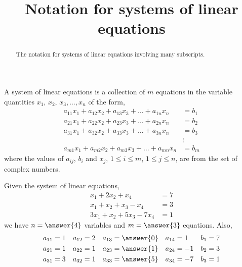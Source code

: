 \documentclass{ximera}
\title{Notation for systems of linear equations}
\begin{document}
\begin{abstract}
  The notation for systems of linear equations involving many subscripts.
\end{abstract}
\maketitle

\begin{definition}
A system of linear equations is a collection of $m$ equations in the variable quantities $x_1,\,x_2,\,x_3,\ldots,x_n$ of the form,
\begin{align*}
a_{11}x_1+a_{12}x_2+a_{13}x_3+\dots+a_{1n}x_n&=b_1\\
a_{21}x_1+a_{22}x_2+a_{23}x_3+\dots+a_{2n}x_n&=b_2\\
a_{31}x_1+a_{32}x_2+a_{33}x_3+\dots+a_{3n}x_n&=b_3\\
&\vdots\\
a_{m1}x_1+a_{m2}x_2+a_{m3}x_3+\dots+a_{mn}x_n&=b_m
\end{align*}
where the values of $a_{ij}$, $b_i$ and $x_j$, $1\leq i\leq m$, $1\leq j\leq n$, are from the set of complex numbers.
\end{definition}

\begin{example}
Given the system of linear equations,
\begin{align*}
x_1+2x_2 + x_4&= 7\\
x_1+x_2+x_3-x_4&=3\\
3x_1+x_2+5x_3-7x_4&=1
\end{align*}
we have $n=\answer{4}$ variables and $m=\answer{3}$ equations.  Also,
\begin{align*}
a_{11}&=1 & a_{12}&=2 & a_{13}&=\answer{0} & a_{14}&=1 & b_{1}&=7\\
a_{21}&=1 & a_{22}&=1 & a_{23}&=\answer{1} & a_{24}&=-1 & b_{2}&=3\\
a_{31}&=3 & a_{32}&=1 & a_{33}&=\answer{5} & a_{34}&=-7 & b_{3}&=1
\end{align*}
\end{example}
\end{document}
